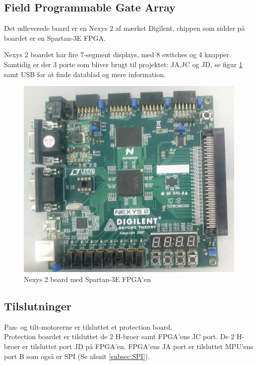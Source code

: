 \subsection{Field Programmable Gate Array}

Det udleverede board er en Nexys 2 af mærket Digilent, chippen som sidder på boardet er en Spartan-3E FPGA.

Nexys 2 boardet har fire 7-segment displays, med 8 switches og 4 knapper. Samtidig er der 3 porte som bliver brugt til projektet: JA,JC og JD, se figur \ref{fig:Nexys2Board} samt USB for at finde datablad og mere information.

\begin{figure}[!ht]
	\begin{center}
		\includegraphics[scale=0.08, angle =0]{Billeder/Nexys2Board.JPG}
	\end{center}
\caption{Nexys 2 board med Spartan-3E FPGA'en}
\label{fig:Nexys2Board}
\end{figure}

\subsection{Tilslutninger}
Pan- og tilt-motorerne er tilsluttet et protection board.\\
Protection boardet er tilsluttet de 2 H-broer samt FPGA'ens JC port.
De 2 H-broer er tilsluttet port JD på FPGA'en.
FPGA'ens JA port er tilsluttet MPU'ens port B som også er SPI (Se afsnit \ref{subsec:SPI}).

